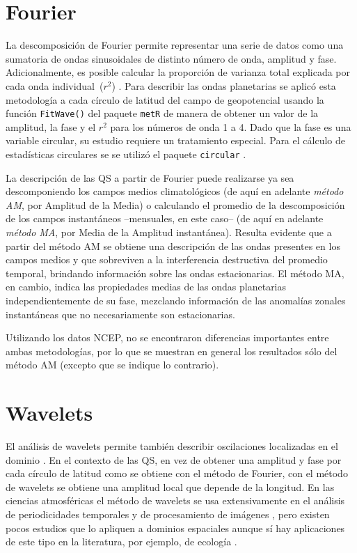 \documentclass[spanish,a4paper,12pt,oneside]{book}
\begin{document}
\section*{Fourier}

La descomposición de Fourier permite representar una serie de datos como
una sumatoria de ondas sinusoidales de distinto número de onda, amplitud
y fase. Adicionalmente, es posible calcular la proporción de varianza
total explicada por cada onda individual~(\(r^2\)) \citep{Wilks2011}.
Para describir las ondas planetarias se aplicó esta metodología a cada
círculo de latitud del campo de geopotencial usando la función
\texttt{FitWave()} del paquete \texttt{metR} \citep{R-metR} de manera de
obtener un valor de la amplitud, la fase y el \(r^2\) para los números
de onda 1 a 4. Dado que la fase es una variable circular, su estudio
requiere un tratamiento especial. Para el cálculo de estadísticas
circulares se se utilizó el paquete \texttt{circular}
\citep{R-circular}.

La descripción de las QS a partir de Fourier puede realizarse ya sea
descomponiendo los campos medios climatológicos (de aquí en adelante
\emph{método AM}, por Amplitud de la Media) o calculando el promedio de
la descomposición de los campos instantáneos --mensuales, en este caso--
(de aquí en adelante \emph{método MA}, por Media de la Amplitud
instantánea). Resulta evidente que a partir del método AM se obtiene una
descripción de las ondas presentes en los campos medios y que sobreviven
a la interferencia destructiva del promedio temporal, brindando
información sobre las ondas estacionarias. El método MA, en cambio,
indica las propiedades medias de las ondas planetarias
independientemente de su fase, mezclando información de las anomalías
zonales instantáneas que no necesariamente son estacionarias.

Utilizando los datos NCEP, no se encontraron diferencias importantes
entre ambas metodologías, por lo que se muestran en general los
resultados sólo del método AM (excepto que se indique lo contrario).

\section*{Wavelets}

El análisis de wavelets permite también describir oscilaciones
localizadas en el dominio \citep{Torrence1998}. En el contexto de las
QS, en vez de obtener una amplitud y fase por cada círculo de latitud
como se obtiene con el método de Fourier, con el método de wavelets se
obtiene una amplitud local que depende de la longitud. En las ciencias
atmosféricas el método de wavelets se usa extensivamente en el análisis
de periodicidades temporales \citep[ej.][]{Raphael2004, Kinnard2011} y
de procesamiento de imágenes \citep[ej.][]{Desrochers1999}, pero existen
pocos estudios que lo apliquen a dominios espaciales
\citep[ej.][]{Pinault2016} aunque sí hay aplicaciones de este tipo en la
literatura, por ejemplo, de ecología \citep[ej,][]{Mi2005}.
\end{document}

